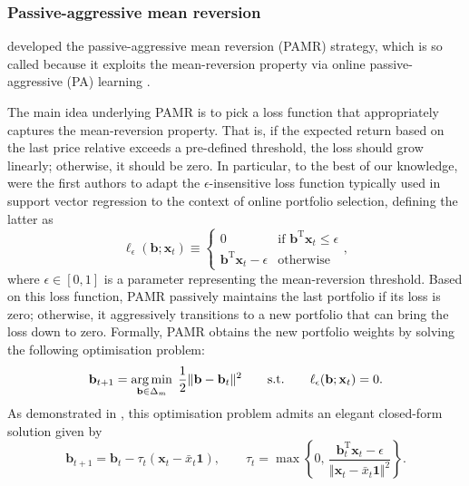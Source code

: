 \subsubsection{Passive-aggressive mean reversion}

\citet{pamr} developed the passive-aggressive mean reversion (PAMR) strategy, which is so called because it exploits the mean-reversion property via online passive-aggressive (PA) learning \citep{crammer06}.

The main idea underlying PAMR is to pick a loss function that appropriately captures the mean-reversion property. That is, if the expected return based on the last price relative exceeds a pre-defined threshold, the loss should grow linearly; otherwise, it should be zero. In particular, to the best of our knowledge, \citet{pamr} were the first authors to adapt the $\epsilon$-insensitive loss function typically used in support vector regression \citep{vapnik98} to the context of online portfolio selection, defining the latter as
\begin{equation}
	\ell_{\epsilon}(\mathbf{b}; \mathbf{x}_t) \equiv
	\begin{cases}
		0 & \text{if } \mathbf{b}^\text{T}\mathbf{x}_t \leq \epsilon \\
		\mathbf{b}^\text{T}\mathbf{x}_t - \epsilon & \text{otherwise}
	\end{cases},
\end{equation}
where $\epsilon \in [0,1]$ is a parameter representing the mean-reversion threshold. Based on this loss function, PAMR passively maintains the last portfolio if its loss is zero; otherwise, it aggressively transitions to a new portfolio that can bring the loss down to zero. Formally, PAMR obtains the new portfolio weights by solving the following optimisation problem:
\begin{equation}
\label{eq:pamr-optprob}
	\mathbf{b}_{t+1}
	= \operatorname*{arg\,min}_{\mathbf{b}\in\Delta_m} \; \frac{1}{2}\Vert\mathbf{b} - \mathbf{b}_t\Vert^2
	\qquad \text{s.t.} \qquad \ell_{\epsilon}(\mathbf{b}; \mathbf{x}_t) = 0.
\end{equation}
As demonstrated in \citep[Proposition~1]{pamr}, this optimisation problem admits an elegant closed-form solution given by
\begin{equation}
	\mathbf{b}_{t+1} = \mathbf{b}_{t} - \tau_t(\mathbf{x}_t - \bar{x}_t\mathbf{1}),
	\qquad \tau_t = \max\left\{0, \, \frac{\mathbf{b}_{t}^\text{T}\mathbf{x}_{t} - \epsilon}{\Vert\mathbf{x}_t - \bar{x}_t\mathbf{1}\Vert^2}\right\}.
\end{equation}
